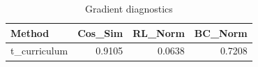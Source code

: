 \begin{table}[htbp]
\centering
\caption{Gradient diagnostics}
\label{tab:grad-diag}
\begin{tabular}{lrrr}
\toprule
\textbf{Method} & \textbf{Cos\_Sim} & \textbf{RL\_Norm} & \textbf{BC\_Norm} \\
\midrule
t\_curriculum & 0.9105 & 0.0638 & 0.7208 \\
\bottomrule
\end{tabular}
\end{table}